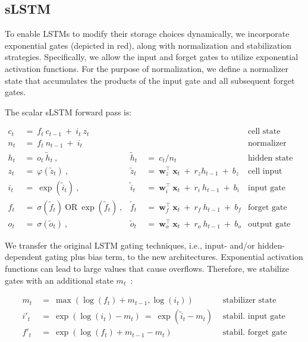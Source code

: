 \subsection{sLSTM}
\label{sec:sLSTM}

To enable LSTMs to modify their storage choices dynamically, we incorporate exponential gates (depicted in red), along with normalization and stabilization strategies. Specifically, we allow the input and forget gates to utilize exponential activation functions. For the purpose of normalization, we define a normalizer state that accumulates the products of the input gate and all subsequent forget gates.

The scalar sLSTM forward pass is:

\begin{align}
\label{eq:slstmforward}
c_t \ &= \  f_t \ c_{t-1} \ + \ i_t \ z_t & & 
 &\text{cell state} \\
n_t \ &= \  f_t \ n_{t-1} \ + \ i_t  & & 
 &\text{normalizer state} \\
h_t \ &= \ o_t \ \tilde{h}_t \ ,
  &\tilde{h}_t \ &= \ c_t / n_t
&\text{hidden state} \\
z_t \ &= \ \varphi \left( \tilde{z}_t \right) \ , 
  &\tilde{z}_t \ &=  \ \mathbf{w}^\top_{z} \ \mathbf{x}_t \ + \
  r_{z}  h_{t-1} \ + \  b_{z}
  &\text{cell input} \\
i_t \ &= \ \!\exp \left( \tilde{i}_t  \right) \ , 
  &\tilde{i}_t \ &= \ \mathbf{w}^\top_{i} \ \mathbf{x}_t \ + \
  r_{i}  \ h_{t-1} \ + \  b_{i}
  &\text{input gate} \\
f_t \ &= \ \sigma \left(  \tilde{f}_t \right) \ \text{OR} \
\!\exp \left(  \tilde{f}_t \right) \ ,
  &\tilde{f}_t \ &= \ \mathbf{w}^\top_{f} \ \mathbf{x}_t  \ + \
  r_{f}  \ h_{t-1} \ + \  b_{f}
  &\text{forget gate} \\
o_t \ &= \ \sigma \left( \tilde{o}_t \right) \ , 
  &\tilde{o}_t  \ &= \ \mathbf{w}^\top_{o} \ \mathbf{x}_t \ + \
  r_{o}  \ h_{t-1} \ + \  b_{o}
  &\text{output gate} 
\end{align}

We transfer the original LSTM gating techniques, i.e., input- and/or hidden-dependent gating plus bias term, to the new architectures. Exponential activation functions can lead to large values that cause overflows. Therefore, we stabilize gates with an additional state \mbox{$m_t$~\citep{Milakov:18arxiv}}:

\begin{align}
\label{eq:slstmstabil}
m_t \ &= \ \max \left( \log ( f_t ) + m_{t-1} , \log ( i_t ) \right) &\text{stabilizer state} \\
i'_t \ &= \ \!\exp \left( \log \left ( i_t \right) - m_t \right) \ = \ \!\exp \left( \tilde{i}_t - m_t \right) \ \, 
  &\text{stabil. input gate} \\
f'_t \ &= \ \!\exp \left( \log \left( f_t \right) + m_{t-1} - m_t \right) \ \, 
  &\text{stabil. forget gate}
\end{align}

